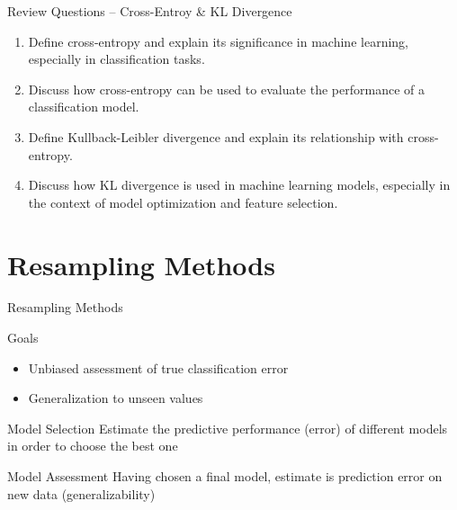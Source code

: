 \documentclass[ignorenonframetext,xcolor=x11names]{beamer}
\begin{document}
\begin{frame}[label=full]{Review Questions -- Cross-Entroy \& KL Divergence}
\begin{enumerate}
  \item Define cross-entropy and explain its significance in machine learning, especially in classification tasks.
  \item Discuss how cross-entropy can be used to evaluate the performance of a classification model.
  \item Define Kullback-Leibler divergence and explain its relationship with cross-entropy.
  \item Discuss how KL divergence is used in machine learning models, especially in the context of model optimization and feature selection.
\end{enumerate}
\end{frame}

\section{Resampling Methods}

\begin{frame}[label=full]{Resampling Methods}
\begin{block}{Goals}
\begin{itemize}
  \item Unbiased assessment of true classification error
  \item Generalization to unseen values
\end{itemize}
\end{block}

\begin{block}{Model Selection}
Estimate the predictive performance (error) of different models in order to choose the best one
\end{block}

\begin{block}{Model Assessment}
Having chosen a final model, estimate is prediction error on new data (generalizability)
\end{block}
\end{frame}
\end{document}
